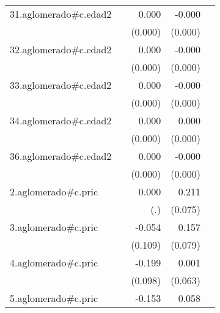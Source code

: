 {\begin{longtable}{l*{4}{D{.}{.}{-1}}}
\addlinespace
31.aglomerado#c.edad2&                     &       0.000         &      -0.000         &                     \\
            &                     &     (0.000)         &     (0.000)         &                     \\
\addlinespace
32.aglomerado#c.edad2&                     &       0.000\sym{*}  &      -0.000         &                     \\
            &                     &     (0.000)         &     (0.000)         &                     \\
\addlinespace
33.aglomerado#c.edad2&                     &       0.000\sym{**} &      -0.000         &                     \\
            &                     &     (0.000)         &     (0.000)         &                     \\
\addlinespace
34.aglomerado#c.edad2&                     &       0.000\sym{*}  &       0.000         &                     \\
            &                     &     (0.000)         &     (0.000)         &                     \\
\addlinespace
36.aglomerado#c.edad2&                     &       0.000         &      -0.000         &                     \\
            &                     &     (0.000)         &     (0.000)         &                     \\
\addlinespace
2.aglomerado#c.pric&                     &       0.000         &       0.211\sym{**} &                     \\
            &                     &         (.)         &     (0.075)         &                     \\
\addlinespace
3.aglomerado#c.pric&                     &      -0.054         &       0.157\sym{*}  &                     \\
            &                     &     (0.109)         &     (0.079)         &                     \\
\addlinespace
4.aglomerado#c.pric&                     &      -0.199\sym{*}  &       0.001         &                     \\
            &                     &     (0.098)         &     (0.063)         &                     \\
\addlinespace
5.aglomerado#c.pric&                     &      -0.153         &       0.058         &                     \\

\end{longtable}}
